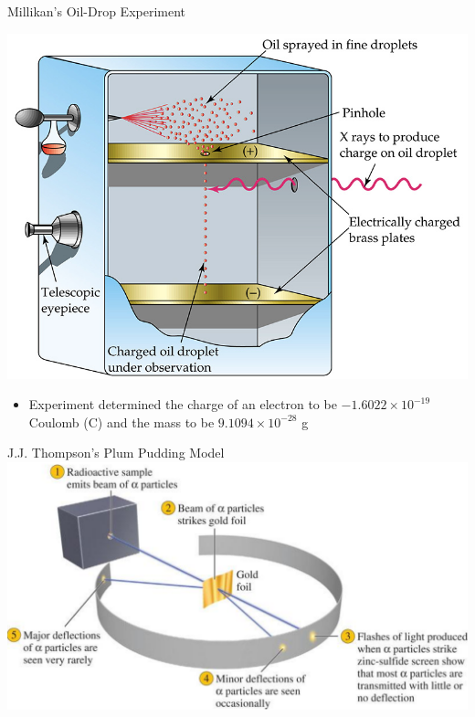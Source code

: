 \documentclass[11pt]{beamer}
\begin{document}
\begin{frame}{Millikan's Oil-Drop Experiment}
  \begin{center}
    \includegraphics[scale=0.27]{millikin_oil}
  \end{center}

  \begin{itemize}
  \item Experiment determined the charge of an electron
    to be $-1.6022\times 10^{-19}$ Coulomb (C) and the mass to be
    $9.1094\times 10^{-28}$ g
  \end{itemize}
\end{frame}

\begin{frame}{J.J. Thompson's Plum Pudding Model}
  \centering
  \includegraphics[scale=0.175]{alpha}
\end{frame}
\end{document}
